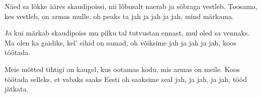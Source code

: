 N\"aed sa l\~okke \"a\"ares skaudipoissi,
nii l\~obusalt naerab ja s\~obraga vestleb.
Toosama, kes vestleb, on armas mulle.
oh peaks ta jah ja jah ja jah,
mind m\"arkama.

Ja kui m\"arkab skaudipoiss mu pilku
tal tutvustan ennast, mul oled sa vennaks.
Ma olen ka gaidiks, kel' sihid on samad,
oh v\~oiksime  jah ja jah ja jah,
koos t\"o\"otada.

Meie m\~otted tihtigi on kaugel,
kus ootamas kodu, mis armas on meile.
Koos t\"o\"otada selleks, et vabaks saaks Eesti
oh saaksime seal jah, ja jah, ja jah,
t\"o\"od j\"atkata.